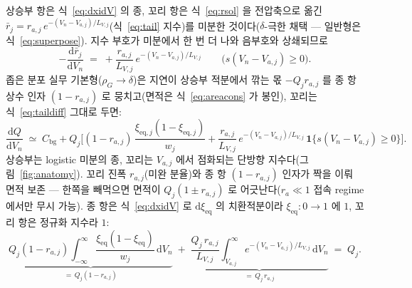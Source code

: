 \documentclass[11pt,a4paper]{article}
\newcommand{\dd}{\mathrm{d}}
\newcommand{\eq}{\mathrm{eq}}
\newcommand{\bg}{\mathrm{bg}}
\begin{document}
상승부 항은 식~\eqref{eq:dxidV} 의 종, 꼬리 항은 식~\eqref{eq:rsol} 을 전압축으로 옮긴 $\bar r_j=r_{a,j}\,e^{-(V_n-V_{a,j})/L_{V,j}}$(식~\eqref{eq:tail} 지수)를 미분한 것이다($\delta$-극한 채택 — 일반형은 식~\eqref{eq:superpose}). 지수 부호가 미분에서 한 번 더 나와 음부호와 상쇄되므로
\begin{equation}
-\frac{\dd\bar r_j}{\dd V_n}\;=\;+\frac{r_{a,j}}{L_{V,j}}\,e^{-(V_n-V_{a,j})/L_{V,j}}
\qquad\big(s(V_n-V_{a,j})\ge0\big).
\label{eq:taildiff}
\end{equation}
좁은 분포 실무 기본형($\rho_G\to\delta$)은 지연이 상승부 적분에서 깎는 몫 $-Q_jr_{a,j}$ 를 종 항 상수 인자 $(1-r_{a,j})$ 로 뭉치고(면적은 식~\eqref{eq:areacons} 가 봉인), 꼬리는 식~\eqref{eq:taildiff} 그대로 두면:
\begin{equation}
\frac{\dd Q}{\dd V_n}\;\simeq\;C_\bg+Q_j\bigg[
(1-r_{a,j})\,\frac{\xi_{\eq,j}(1-\xi_{\eq,j})}{w_j}
+\frac{r_{a,j}}{L_{V,j}}\,e^{-(V_n-V_{a,j})/L_{V,j}}\,\mathbf 1\{s(V_n-V_{a,j})\ge0\}\bigg].
\label{eq:simplefit}
\end{equation}
상승부는 logistic 미분의 종, 꼬리는 $V_{a,j}$ 에서 점화되는 단방향 지수다(그림~\ref{fig:anatomy}). 꼬리 진폭 $r_{a,j}$(미완 분율)와 종 항 $(1-r_{a,j})$ 인자가 짝을 이뤄 면적 보존 — 한쪽을 빼먹으면 면적이 $Q_j(1\pm r_{a,j})$ 로 어긋난다($r_a\ll1$ 접속 regime 에서만 무시 가능). 종 항은 식~\eqref{eq:dxidV} 로 $\dd\xi_{\eq}$ 의 치환적분이라 $\xi_{\eq}:0\to1$ 에 $1$, 꼬리 항은 정규화 지수라 $1$:
\begin{equation}
\underbrace{Q_j(1-r_{a,j})\!\int_{-\infty}^{\infty}\!
\frac{\xi_{\eq}(1-\xi_{\eq})}{w_j}\,\dd V_n}_{=\,Q_j(1-r_{a,j})}
\;+\;
\underbrace{\frac{Q_j\,r_{a,j}}{L_{V,j}}\!\int_{V_{a,j}}^{\infty}\!
e^{-(V_n-V_{a,j})/L_{V,j}}\,\dd V_n}_{=\,Q_j\,r_{a,j}}
\;=\;Q_j.
\label{eq:areacons}
\end{equation}
\end{document}
